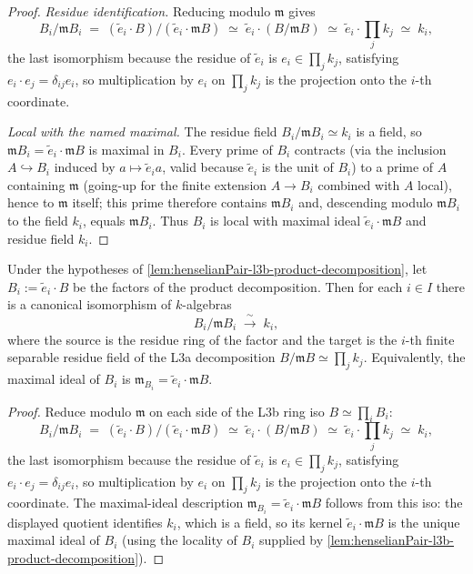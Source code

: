 \begin{proof}
\emph{Residue identification.} Reducing modulo $\mathfrak m$
gives
\[
  B_i / \mathfrak m B_i
  \;=\; (\tilde e_i \cdot B) / (\tilde e_i \cdot \mathfrak m B)
  \;\simeq\; \tilde e_i \cdot (B / \mathfrak m B)
  \;\simeq\; \tilde e_i \cdot \prod_j k_j
  \;\simeq\; k_i,
\]
the last isomorphism because the residue of $\tilde e_i$ is
$e_i \in \prod_j k_j$, satisfying $e_i \cdot e_j = \delta_{ij}
e_i$, so multiplication by $e_i$ on $\prod_j k_j$ is the
projection onto the $i$-th coordinate.

\emph{Local with the named maximal.} The residue field
$B_i / \mathfrak m B_i \simeq k_i$ is a field, so $\mathfrak m
B_i = \tilde e_i \cdot \mathfrak m B$ is maximal in $B_i$. Every
prime of $B_i$ contracts (via the inclusion $A \hookrightarrow
B_i$ induced by $a \mapsto \tilde e_i a$, valid because
$\tilde e_i$ is the unit of $B_i$) to a prime of $A$ containing
$\mathfrak m$ (going-up for the finite extension $A \to B_i$
combined with $A$ local), hence to $\mathfrak m$ itself; this
prime therefore contains $\mathfrak m B_i$ and, descending modulo
$\mathfrak m B_i$ to the field $k_i$, equals $\mathfrak m B_i$.
Thus $B_i$ is local with maximal ideal $\tilde e_i \cdot
\mathfrak m B$ and residue field $k_i$.
\end{proof}

\begin{lemma}
\label{lem:henselianPair-l3b-bis-residue-field}
Under the hypotheses of
\cref{lem:henselianPair-l3b-product-decomposition}, let
$B_i := \tilde e_i \cdot B$ be the factors of the product
decomposition. Then for each $i \in I$ there is a canonical
isomorphism of $k$-algebras
\[
  B_i / \mathfrak m B_i \;\xrightarrow{\ \sim\ }\; k_i,
\]
where the source is the residue ring of the factor and the
target is the $i$-th finite separable residue field of the L3a
decomposition $B / \mathfrak m B \simeq \prod_j k_j$. Equivalently,
the maximal ideal of $B_i$ is $\mathfrak m_{B_i} = \tilde e_i
\cdot \mathfrak m B$.
\end{lemma}

\begin{proof}
Reduce modulo $\mathfrak m$ on each side of the L3b ring iso
$B \simeq \prod_i B_i$:
\[
  B_i / \mathfrak m B_i
  \;=\; (\tilde e_i \cdot B) / (\tilde e_i \cdot \mathfrak m B)
  \;\simeq\; \tilde e_i \cdot (B / \mathfrak m B)
  \;\simeq\; \tilde e_i \cdot \prod_j k_j
  \;\simeq\; k_i,
\]
the last isomorphism because the residue of $\tilde e_i$ is
$e_i \in \prod_j k_j$, satisfying $e_i \cdot e_j = \delta_{ij}
e_i$, so multiplication by $e_i$ on $\prod_j k_j$ is the
projection onto the $i$-th coordinate. The maximal-ideal
description $\mathfrak m_{B_i} = \tilde e_i \cdot \mathfrak m B$
follows from this iso: the displayed quotient identifies $k_i$,
which is a field, so its kernel
$\tilde e_i \cdot \mathfrak m B$ is the unique maximal ideal of
$B_i$ (using the locality of $B_i$ supplied by
\cref{lem:henselianPair-l3b-product-decomposition}).
\end{proof}

